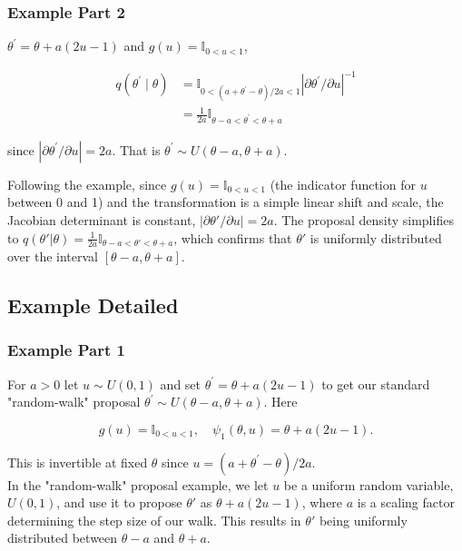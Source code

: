 \documentclass[10pt]{article}
\begin{document}
\subsubsection*{Example Part 2}
$\theta^{\prime}=\theta+a(2 u-1)$ and $g(u)=\mathbb{I}_{0<u<1}$,

$$
\begin{aligned}
q\left(\theta^{\prime} \mid \theta\right) & =\mathbb{I}_{0<\left(a+\theta^{\prime}-\theta\right) / 2 a<1}\left|\partial \theta^{\prime} / \partial u\right|^{-1} \\
& =\frac{1}{2 a} \mathbb{I}_{\theta-a<\theta^{\prime}<\theta+a}
\end{aligned}
$$

since $\left|\partial \theta^{\prime} / \partial u\right|=2 a$. That is $\theta^{\prime} \sim U(\theta-a, \theta+a)$.

Following the example, since \(g(u) = \mathbb{I}_{0<u<1}\) (the indicator function for \(u\) between 0 and 1) and the transformation is a simple linear shift and scale, the Jacobian determinant is constant, \(|\partial \theta' / \partial u| = 2a\). The proposal density simplifies to \(q(\theta'|\theta) = \frac{1}{2a} \mathbb{I}_{\theta-a<\theta'<\theta+a}\), which confirms that \(\theta'\) is uniformly distributed over the interval \([\theta-a, \theta+a]\).

\subsection*{Example Detailed}

\subsubsection*{Example Part 1}
For $a>0$ let $u \sim U(0,1)$ and set $\theta^{\prime}=\theta+a(2 u-1)$ to get our standard "random-walk" proposal $\theta^{\prime} \sim U(\theta-a, \theta+a)$. Here

$$
g(u)=\mathbb{I}_{0<u<1}, \quad \psi_1(\theta, u)=\theta+a(2 u-1) .
$$

This is invertible at fixed $\theta$ since $u=\left(a+\theta^{\prime}-\theta\right) / 2 a$.\\
In the "random-walk" proposal example, we let \(u\) be a uniform random variable, \(U(0,1)\), and use it to propose \(\theta'\) as \(\theta + a(2u - 1)\), where \(a\) is a scaling factor determining the step size of our walk. This results in \(\theta'\) being uniformly distributed between \(\theta-a\) and \(\theta+a\).
\end{document}
